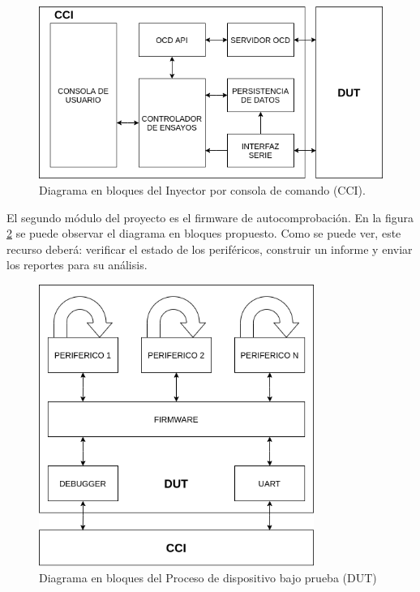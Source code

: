 \documentclass[
11pt, %
]{charter}
\begin{document}
\begin{figure}[htpb]
	\centering 
	\includegraphics[width=\textwidth]{./Figuras/CCIbloques.png}
	\caption{Diagrama en bloques del Inyector por consola de comando (CCI).}
	\label{fig:diagInyector}
\end{figure}

El segundo módulo del proyecto es el firmware de autocomprobación.
En la figura \ref{fig:diagSelfTesting} se puede observar el diagrama en bloques propuesto.
Como se puede ver, este recurso deberá: verificar el estado de los periféricos, construir un informe y enviar los reportes para su análisis.

\begin{figure}[htpb]
	\centering 
	\includegraphics[width=0.8\textwidth]{./Figuras/DUTbloques.png}
	\caption{Diagrama en bloques del Proceso de dispositivo bajo prueba (DUT)}
	\label{fig:diagSelfTesting}
\end{figure}
\end{document}
